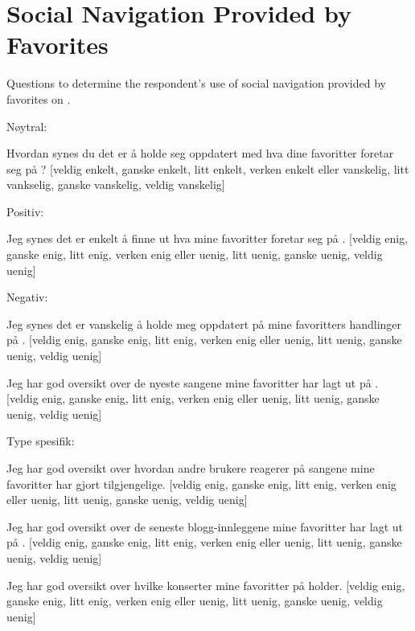 \section{Social Navigation Provided by Favorites}

Questions to determine the respondent's use of
social navigation provided by favorites on \urort{}.

\begin{items}
  \item Nøytral:
  \item Hvordan synes du det er å holde seg oppdatert med hva dine favoritter
    foretar seg på \urort{}?
    [veldig enkelt, ganske enkelt, litt enkelt,
    verken enkelt eller vanskelig,
    litt vankselig, ganske vanskelig, veldig vanskelig]
  \item Positiv:
  \item Jeg synes det er enkelt å finne ut hva mine favoritter
    foretar seg på \urort{}.
    [veldig enig, ganske enig, litt enig,
    verken enig eller uenig,
    litt uenig, ganske uenig, veldig uenig]
  \item Negativ:
  \item Jeg synes det er vanskelig å holde meg oppdatert på mine
    favoritters handlinger på \urort{}.
    [veldig enig, ganske enig, litt enig,
    verken enig eller uenig,
    litt uenig, ganske uenig, veldig uenig]
  \item Jeg har god oversikt over de nyeste sangene mine favoritter
    har lagt ut på \urort{}.
    [veldig enig, ganske enig, litt enig,
    verken enig eller uenig,
    litt uenig, ganske uenig, veldig uenig]
  \item Type spesifik:
  \item Jeg har god oversikt over hvordan andre \urort{} brukere reagerer på
    sangene mine favoritter har gjort tilgjengelige.
    [veldig enig, ganske enig, litt enig,
    verken enig eller uenig,
    litt uenig, ganske uenig, veldig uenig]
  \item Jeg har god oversikt over de seneste blogg-innleggene
    mine favoritter har lagt ut på \urort{}.
    [veldig enig, ganske enig, litt enig,
    verken enig eller uenig,
    litt uenig, ganske uenig, veldig uenig]
  \item Jeg har god oversikt over hvilke konserter mine favoritter
    på \urort{} holder.
    [veldig enig, ganske enig, litt enig,
    verken enig eller uenig,
    litt uenig, ganske uenig, veldig uenig]
\end{items}

